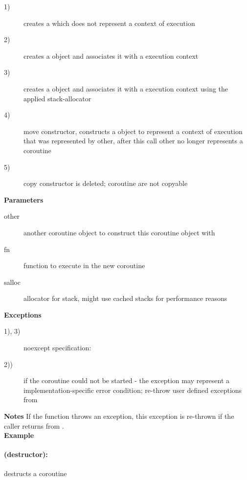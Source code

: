 \begin{description}
    \item[1)] creates a \pushcoro which does not represent a context of
              execution
    \item[2)] creates a \pushcoro object and associates it with a execution
              context
    \item[3)] creates a \pushcoro object and associates it with a execution
              context using the applied stack-allocator
    \item[4)] move constructor, constructs a \pushcoro object to represent a
              context of execution that was represented by other, after this
              call other no longer represents a coroutine
    \item[5)] copy constructor is deleted; coroutine are not copyable
\end{description}

{\bf Parameters}
\begin{description}
    \item[other] another coroutine object to construct this coroutine object
                 with
    \item[fn]    function to execute in the new coroutine
    \item[salloc] allocator for stack, might use cached stacks for performance
                  reasons
\end{description}

{\bf Exceptions}
\begin{description}
    \item[1), 3)] noexcept specification: 
    \item[2))]     if the coroutine could not be started
                  - the exception may represent a implementation-specific error
                  condition; re-throw user defined exceptions from \corofunction
\end{description}

{\bf Notes}
If the function throws an exception, this exception is re-thrown if the caller
returns from \pushcoroop.\\

{\bf Example}

\paragraph*{(destructor):}
destructs a coroutine\\

